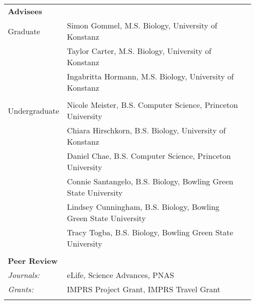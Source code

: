 \documentclass[letterpaper,7pt,oneside]{article}
\begin{document}
\begin{small}
\begin{longtable}{@{} l p{5.3in}l}
 \Large{\textbf{Advisees}}  \vspace{5mm} \\
 \large{Graduate} 
 & Simon Gommel, M.S. Biology, University of Konstanz \\
 & Taylor Carter, M.S. Biology, University of Konstanz \\
 & Ingabritta Hormann, M.S. Biology, University of Konstanz \\

 & \\
 \large{Undergraduate}
 & Nicole Meister, B.S. Computer Science, Princeton University \\
  & Chiara Hirschkorn, B.S. Biology, University of Konstanz \\
  & Daniel Chae, B.S. Computer Science, Princeton University \\
 &  Connie Santangelo, B.S. Biology, Bowling Green State University \\
 & Lindsey Cunningham, B.S. Biology, Bowling Green State University \\
 & Tracy Togba, B.S. Biology, Bowling Green State University \\
& \\

 \Large{\textbf{Peer Review}}  \vspace{5mm} \\
 \normalsize{\textit{Journals: }} & eLife, Science Advances, PNAS \vspace{1mm} \\
 \normalsize{\textit{Grants: }} & IMPRS Project Grant, IMPRS Travel Grant \vspace{1mm} \\
 & \\


\end{longtable}
\end{small}
\end{document}
